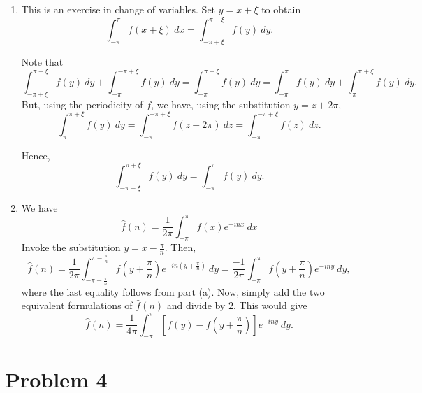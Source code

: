 \documentclass[12pt]{amsart}
\newcommand{\wh}[1]{\widehat{#1}}
\begin{document}
\begin{enumerate}[label=(\alph*)]
    \item This is an exercise in change of variables. Set $y = x + \xi$ to obtain 
    \begin{equation*}
        \int_{-\pi}^\pi f(x + \xi)~dx = \int_{-\pi + \xi}^{\pi + \xi}f(y)~dy.
    \end{equation*}

    Note that 
    \begin{equation*}
        \int_{-\pi + \xi}^{\pi + \xi}f(y)~dy + \int_{-\pi}^{-\pi + \xi} f(y)~dy = \int_{-\pi}^{\pi + \xi} f(y)~dy = \int_{-\pi}^{\pi}f(y)~dy + \int_{\pi}^{\pi + \xi}f(y)~dy.
    \end{equation*}
    But, using the periodicity of $f$, we have, using the substitution $y = z + 2\pi$,
    \begin{equation*}
        \int_{\pi}^{\pi + \xi}f(y)~dy = \int_{-\pi}^{-\pi + \xi}f(z + 2\pi)~dz = \int_{-\pi}^{-\pi + \xi} f(z)~dz.
    \end{equation*}

    Hence, 
    \begin{equation*}
        \int_{-\pi + \xi}^{\pi + \xi}f(y)~dy = \int_{-\pi}^{\pi} f(y)~dy.
    \end{equation*}

    \item We have 
    \begin{equation*}
        \wh f(n) = \frac{1}{2\pi}\int_{-\pi}^\pi f(x)e^{-inx}~dx
    \end{equation*}
    Invoke the substitution $y = x - \frac{\pi}{n}$. Then, 
    \begin{equation*}
        \wh f(n) = \frac{1}{2\pi}\int_{-\pi - \frac{\pi}{n}}^{\pi - \frac{\pi}{n}}f\left(y + \frac{\pi}{n}\right)e^{-in\left(y + \frac{\pi}{n}\right)}~dy = \frac{-1}{2\pi}\int_{-\pi}^{\pi}f\left(y + \frac{\pi}{n}\right)e^{-iny}~dy,
    \end{equation*}
    where the last equality follows from part (a). Now, simply add the two equivalent formulations of $\wh f(n)$ and divide by $2$. This would give 
    \begin{equation*}
        \wh f(n) = \frac{1}{4\pi}\int_{-\pi}^\pi\left[f(y) - f\left(y + \frac{\pi}{n}\right)\right]e^{-iny}~dy.
    \end{equation*}
\end{enumerate}

\section*{Problem 4}
\end{document}
